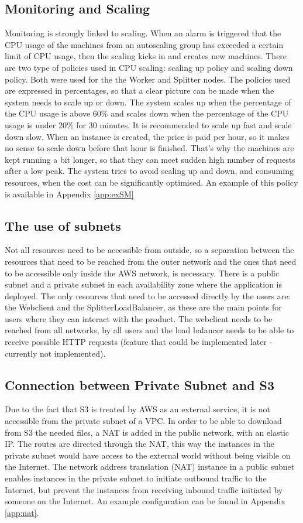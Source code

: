 \documentclass{acm_proc_article-sp}
\begin{document}
\subsection{Monitoring and Scaling}
Monitoring is strongly linked to scaling. 
When an alarm is triggered that the CPU usage of the machines from an autoscaling group has exceeded a certain limit of CPU usage, then the scaling kicks in and creates new machines.
There are two type of policies used in CPU scaling: scaling up policy and scaling down policy. 
Both were used for the the Worker and Splitter nodes. 
The policies used are expressed in percentages, so that a clear picture can be made when the system needs to scale up or down.
The system scales up when the percentage of the CPU usage is above 60\% and scales down when the percentage of the CPU usage is under 20\% for 30 minutes.
It is recommended to scale up fast and scale down slow.
When an instance is created, the price is paid per hour, so it makes no sense to scale down before that hour is finished. 
That's why the machines are kept running a bit longer, so that they can meet sudden high number of requests after a low peak. 
The system tries to avoid scaling up and down, and consuming resources, when the cost can be significantly optimised.
An example of this policy is available in Appendix \ref{app:exSM}


\subsection{The use of subnets}
Not all resources need to be accessible from outside, so a separation between the resources that need to be reached from the outer network and the ones that need to be accessible only inside the AWS network, is necessary.
There is a public subnet and a private subnet in each availability zone where the application is deployed. 
The only resources that need to be accessed directly by the users are: the Webclient and the SplitterLoadBalancer, as these are the main points for users where they can interact with the product.
The webclient needs to be reached from all networks, by all users and the load balancer needs to be able to receive possible HTTP requests (feature that could be implemented later - currently not implemented).

\subsection{Connection between Private Subnet and S3}
Due to the fact that S3 is treated by AWS as an external service, it is not accessible from the private subnet of a VPC. 
In order to be able to download from S3 the needed files, a NAT is added in the public network, with an elastic IP. 
The routes are directed through the NAT, this way the instances in the private subnet would have access to the external world without being visible on the Internet.
The network address translation (NAT) instance in a public subnet enables instances in the private subnet to initiate outbound traffic to the Internet, but prevent the instances from receiving inbound traffic initiated by someone on the Internet.
An example configuration can be found in Appendix \ref{app:nat}.
\end{document}
